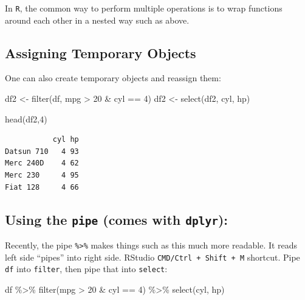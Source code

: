 \documentclass[
]{article}
\newenvironment{Shaded}{\begin{snugshade}}{\end{snugshade}}
\newcommand{\DecValTok}[1]{\textcolor[rgb]{0.00,0.00,0.81}{#1}}
\newcommand{\FunctionTok}[1]{\textcolor[rgb]{0.00,0.00,0.00}{#1}}
\newcommand{\NormalTok}[1]{#1}
\newcommand{\OtherTok}[1]{\textcolor[rgb]{0.56,0.35,0.01}{#1}}
\newcommand{\SpecialCharTok}[1]{\textcolor[rgb]{0.00,0.00,0.00}{#1}}
\begin{document}
In \texttt{R}, the common way to perform multiple operations is to wrap
functions around each other in a nested way such as above.

\hypertarget{assigning-temporary-objects}{%
\subsection{Assigning Temporary
Objects}\label{assigning-temporary-objects}}

One can also create temporary objects and reassign them:

\begin{Shaded}
\begin{Highlighting}[]
\NormalTok{df2 }\OtherTok{\textless{}{-}} \FunctionTok{filter}\NormalTok{(df, mpg }\SpecialCharTok{\textgreater{}} \DecValTok{20} \SpecialCharTok{\&}\NormalTok{ cyl }\SpecialCharTok{==} \DecValTok{4}\NormalTok{)}
\NormalTok{df2 }\OtherTok{\textless{}{-}} \FunctionTok{select}\NormalTok{(df2, cyl, hp)}

\FunctionTok{head}\NormalTok{(df2,}\DecValTok{4}\NormalTok{)}
\end{Highlighting}
\end{Shaded}

\begin{verbatim}
           cyl hp
Datsun 710   4 93
Merc 240D    4 62
Merc 230     4 95
Fiat 128     4 66
\end{verbatim}

\hypertarget{using-the-pipe-comes-with-dplyr}{%
\subsection{\texorpdfstring{Using the \texttt{pipe} (comes with
\texttt{dplyr}):}{Using the pipe (comes with dplyr):}}\label{using-the-pipe-comes-with-dplyr}}

Recently, the pipe \texttt{\%\textgreater{}\%} makes things such as this
much more readable. It reads left side ``pipes'' into right side.
RStudio \texttt{CMD/Ctrl\ +\ Shift\ +\ M} shortcut. Pipe \texttt{df}
into \texttt{filter}, then pipe that into \texttt{select}:

\begin{Shaded}
\begin{Highlighting}[]
\NormalTok{df }\SpecialCharTok{\%\textgreater{}\%} \FunctionTok{filter}\NormalTok{(mpg }\SpecialCharTok{\textgreater{}} \DecValTok{20} \SpecialCharTok{\&}\NormalTok{ cyl }\SpecialCharTok{==} \DecValTok{4}\NormalTok{) }\SpecialCharTok{\%\textgreater{}\%} \FunctionTok{select}\NormalTok{(cyl, hp)}
\end{Highlighting}
\end{Shaded}
\end{document}
